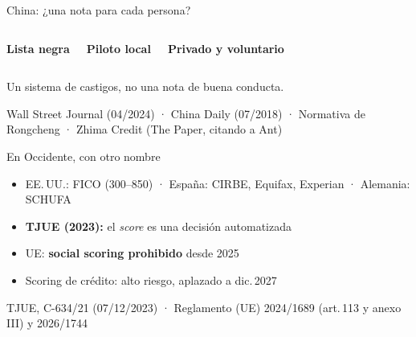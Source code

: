 \documentclass[aspectratio=169,12pt]{beamer}
\def\navprev{}
\def\navnext{}
\newcommand{\nav}[2]{\gdef\navprev{#1}\gdef\navnext{#2}}
\newcommand{\fuente}[1]{\vfill{\small\color{gris}#1\par}}
\begin{document}
\nav{}{Occidente}
\begin{frame}{China: ¿una nota para cada persona?}
  \begin{columns}[T]
      \begin{center}{\large\bfseries\color{azul}Lista negra}\end{center}
      \begin{center}{\large\bfseries\color{azul}Piloto local}\end{center}
      \begin{center}{\large\bfseries\color{azul}Privado y voluntario}\end{center}
  \end{columns}
  \vspace{0.3cm}
  \begin{center}
    {\large\alert{Un sistema de castigos, no una nota de buena conducta.}}
  \end{center}
  \fuente{Wall Street Journal (04/2024) · China Daily (07/2018) · Normativa de Rongcheng · Zhima Credit (The Paper, citando a Ant)}
\end{frame}

\nav{China}{Uso estatal}
\begin{frame}{En Occidente, con otro nombre}
  \begin{itemize}
    \item EE.\,UU.: FICO (300--850) · España: CIRBE, Equifax, Experian · Alemania: SCHUFA
    \item \alert{\textbf{TJUE (2023):}} el \textit{score} es una decisión automatizada
    \item UE: \alert{\textbf{social scoring prohibido}} desde 2025
    \item Scoring de crédito: alto riesgo, aplazado a dic.\,2027
  \end{itemize}
  \fuente{TJUE, C-634/21 (07/12/2023) · Reglamento (UE) 2024/1689 (art.\,113 y anexo III) y 2026/1744}
\end{frame}
\end{document}
